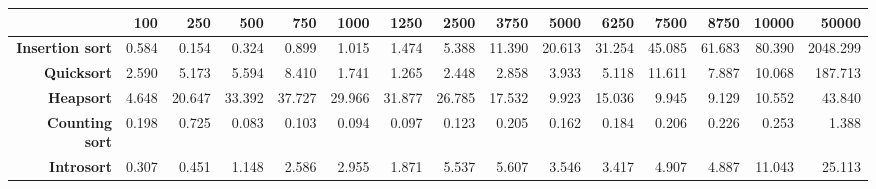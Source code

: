 \begin{tabular}{rrrrrrrrrrrrrrr}
\hline
                         &   \textbf{100} &   \textbf{250} &   \textbf{500} &   \textbf{750} &   \textbf{1000} &   \textbf{1250} &   \textbf{2500} &   \textbf{3750} &   \textbf{5000} &   \textbf{6250} &   \textbf{7500} &   \textbf{8750} &   \textbf{10000} &   \textbf{50000} \\
\hline
 \textbf{Insertion sort} &          0.584 &          0.154 &          0.324 &          0.899 &           1.015 &           1.474 &           5.388 &          11.390 &          20.613 &          31.254 &          45.085 &          61.683 &           80.390 &         2048.299 \\
      \textbf{Quicksort} &          2.590 &          5.173 &          5.594 &          8.410 &           1.741 &           1.265 &           2.448 &           2.858 &           3.933 &           5.118 &          11.611 &           7.887 &           10.068 &          187.713 \\
       \textbf{Heapsort} &          4.648 &         20.647 &         33.392 &         37.727 &          29.966 &          31.877 &          26.785 &          17.532 &           9.923 &          15.036 &           9.945 &           9.129 &           10.552 &           43.840 \\
  \textbf{Counting sort} &          0.198 &          0.725 &          0.083 &          0.103 &           0.094 &           0.097 &           0.123 &           0.205 &           0.162 &           0.184 &           0.206 &           0.226 &            0.253 &            1.388 \\
      \textbf{Introsort} &          0.307 &          0.451 &          1.148 &          2.586 &           2.955 &           1.871 &           5.537 &           5.607 &           3.546 &           3.417 &           4.907 &           4.887 &           11.043 &           25.113 \\
\hline
\end{tabular}